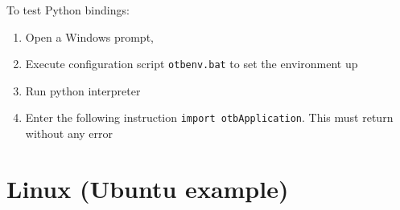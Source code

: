 \documentclass[10pt,a4paper]{article}
\begin{document}
To test Python bindings:

\begin{enumerate}
 \item Open a Windows prompt,
 \item Execute configuration script \verb?otbenv.bat? to set the environment up
 \item Run python interpreter
 \item Enter the following instruction \verb?import otbApplication?. This must return without any error
\end{enumerate}

\clearpage
\section{Linux (Ubuntu example)}
\end{document}
